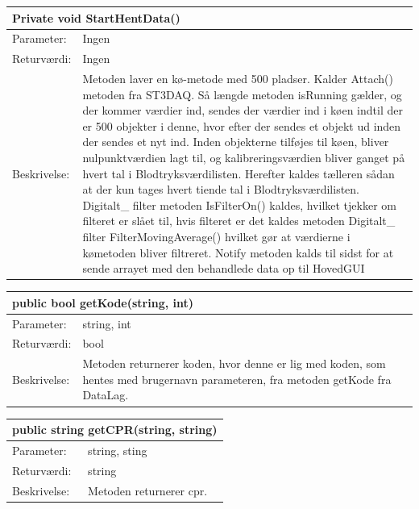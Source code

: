 \begin{table}[H]
\label{tab:tabel2}
\begin{tabular}{| l | p{13cm} |}
   \hline
   \multicolumn{2}{|l|}{Private void StartHentData()} \\ \hline
   Parameter: & Ingen\\ \hline
   Returværdi: & Ingen\\ \hline
   Beskrivelse: & Metoden laver en kø-metode med 500 pladser. Kalder Attach() metoden fra ST3DAQ. Så længde metoden isRunning gælder, og der kommer værdier ind, sendes der værdier ind i køen indtil der er 500 objekter i denne, hvor efter der sendes et objekt ud inden der sendes et nyt ind. Inden objekterne tilføjes til køen, bliver nulpunktværdien lagt til, og kalibreringsværdien bliver ganget på hvert tal i Blodtryksværdilisten. Herefter kaldes tælleren sådan at der kun tages hvert tiende tal i Blodtryksværdilisten. Digitalt\_ filter metoden IsFilterOn() kaldes, hvilket tjekker om filteret er slået til, hvis filteret er det kaldes metoden Digitalt\_ filter FilterMovingAverage() hvilket gør at værdierne i kømetoden bliver filtreret. Notify metoden kalds til sidst for at sende arrayet med den behandlede data op til HovedGUI\\ \hline
\end{tabular}
\end{table}
\begin{table}[H]
\label{tab:tabel2}
\begin{tabular}{| l | p{13cm} |}
   \hline
   \multicolumn{2}{|l|}{public bool getKode(string, int)} \\ \hline
   Parameter: & string, int\\ \hline
   Returværdi: & bool\\ \hline
   Beskrivelse: & Metoden returnerer koden, hvor denne er lig med koden, som hentes med brugernavn parameteren, fra metoden getKode fra DataLag.  \\ \hline
\end{tabular}
\end{table}
\begin{table}[H]
\label{tab:tabel2}
\begin{tabular}{| l | p{13cm} |}
   \hline
   \multicolumn{2}{|l|}{public string getCPR(string, string)} \\ \hline
   Parameter: & string, sting\\ \hline
   Returværdi: & string\\ \hline
   Beskrivelse: & Metoden returnerer cpr. \\ \hline
\end{tabular}
\end{table}
